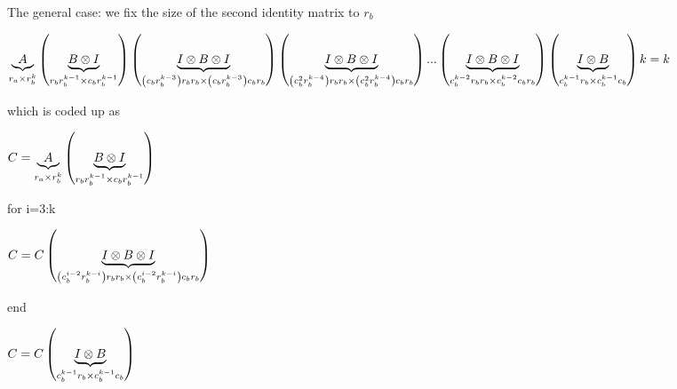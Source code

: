 \documentclass[12pt]{article}
\begin{document}
\begin{landscape}
The general case: we fix the size of the second identity matrix to $r_{b}$

$\underset{r_{a}\times r_{b}^{k}}{\underbrace{A}}\left( \underset{%
r_{b}r_{b}^{k-1}\times c_{b}r_{b}^{k-1}}{\underbrace{B\otimes I}}\right)
\left( \underset{\left( c_{b}r_{b}^{k-3}\right) r_{b}r_{b}\times \left(
c_{b}r_{b}^{k-3}\right) c_{b}r_{b}}{\underbrace{I\otimes B\otimes I}}\right)
\left( \underset{\left( c_{b}^{2}r_{b}^{k-4}\right) r_{b}r_{b}\times \left(
c_{b}^{2}r_{b}^{k-4}\right) c_{b}r_{b}}{\underbrace{I\otimes B\otimes I}}%
\right) ...\left( \underset{c_{b}^{k-2}r_{b}r_{b}\times c_{b}^{k-2}c_{b}r_{b}%
}{\underbrace{I\otimes B\otimes I}}\right) \left( \underset{%
c_{b}^{k-1}r_{b}\times c_{b}^{k-1}c_{b}}{\underbrace{I\otimes B}}\right) k=k$

which is coded up as

$C=\underset{r_{a}\times r_{b}^{k}}{\underbrace{A}}\left( \underset{%
r_{b}r_{b}^{k-1}\times c_{b}r_{b}^{k-1}}{\underbrace{B\otimes I}}\right) $

for i=3:k

\qquad $C=C\left( \underset{\left( c_{b}^{i-2}r_{b}^{k-i}\right)
r_{b}r_{b}\times \left( c_{b}^{i-2}r_{b}^{k-i}\right) c_{b}r_{b}}{%
\underbrace{I\otimes B\otimes I}}\right) $

end

$C=C\left( \underset{c_{b}^{k-1}r_{b}\times c_{b}^{k-1}c_{b}}{\underbrace{%
I\otimes B}}\right) $

\end{landscape}%
\end{document}
